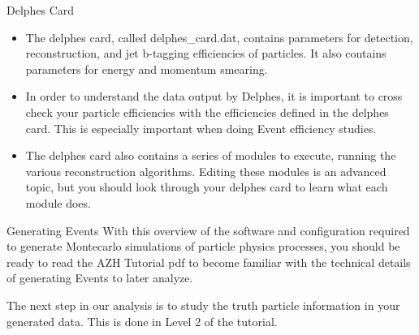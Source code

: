 \documentclass{beamer}
\begin{document}
	\begin{frame}{Delphes Card}
		\begin{itemize}
\item<1->The delphes card, called delphes\_card.dat, contains parameters for detection, reconstruction, and jet b-tagging efficiencies of particles. It also contains parameters for energy and momentum smearing.

\bigskip

\item<1->In order to understand the data output by Delphes, it is important to cross check your particle efficiencies with the efficiencies defined in the delphes card. This is especially important when doing Event efficiency studies.

\bigskip

\item<1->The delphes card also contains a series of modules to execute, running the various reconstruction algorithms. Editing these modules is an advanced topic, but you should look through your delphes card to learn what each module does.
		\end{itemize}
	\end{frame}
	\begin{frame}{Generating Events}
With this overview of the software and configuration required to generate Montecarlo simulations of particle physics processes, you should be ready to read the AZH Tutorial pdf to become familiar with the technical details of generating Events to later analyze.

\bigskip

The next step in our analysis is to study the truth particle information in your generated data. This is done in Level 2 of the tutorial.
	\end{frame}
\end{document}
